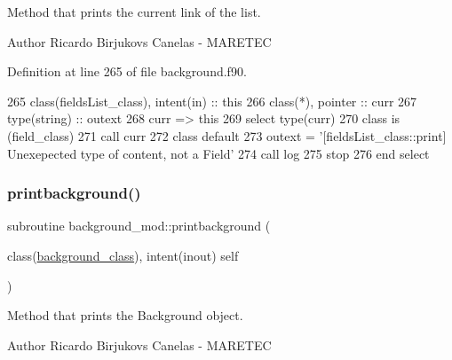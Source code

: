 Method that prints the current link of the list. 

\begin{DoxyAuthor}{Author}
Ricardo Birjukovs Canelas -\/ M\+A\+R\+E\+T\+EC 
\end{DoxyAuthor}


Definition at line 265 of file background.\+f90.


\begin{DoxyCode}
265     \textcolor{keywordtype}{class}(fieldsList\_class), \textcolor{keywordtype}{intent(in)} :: this
266     \textcolor{keywordtype}{class}(*), \textcolor{keywordtype}{pointer} :: curr
267     \textcolor{keywordtype}{type}(string) :: outext
268     curr => this%
269     \textcolor{keywordflow}{select type}(curr)
270 \textcolor{keywordflow}{    class is} (field\_class)
271         \textcolor{keyword}{call }curr%
272 \textcolor{keywordflow}{        class default}
273         outext = \textcolor{stringliteral}{'[fieldsList\_class::print] Unexepected type of content, not a Field'}
274         \textcolor{keyword}{call }log%
275         stop
276 \textcolor{keywordflow}{    end select}
\end{DoxyCode}
\mbox{\label{namespacebackground__mod_a8a8f225cffcddb742f22a402155b703f}} 
\subsubsection{\texorpdfstring{printbackground()}{printbackground()}}
{\footnotesize\ttfamily subroutine background\+\_\+mod\+::printbackground (\begin{DoxyParamCaption}\item[{class(\mbox{\hyperlink{structbackground__mod_1_1background__class}{background\+\_\+class}}), intent(inout)}]{self }\end{DoxyParamCaption})\hspace{0.3cm}{\ttfamily [private]}}



Method that prints the Background object. 

\begin{DoxyAuthor}{Author}
Ricardo Birjukovs Canelas -\/ M\+A\+R\+E\+T\+EC 
\end{DoxyAuthor}


